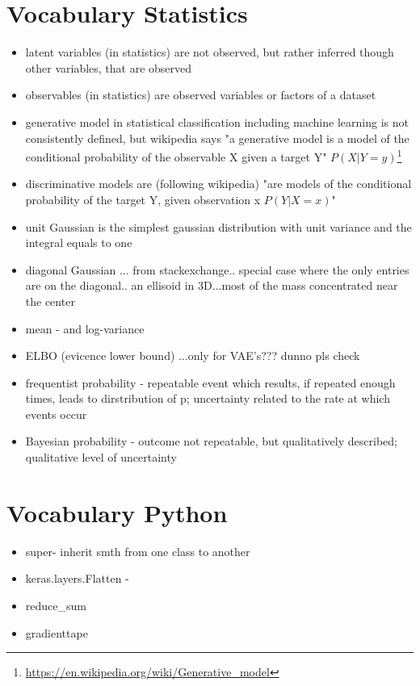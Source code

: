 \documentclass[12pt, a4paper]{article}
\begin{document}
	\section{Vocabulary Statistics}
	\begin{itemize}
		\item latent variables (in statistics) are not observed, but rather inferred though other variables, that are observed
		\item observables (in statistics) are observed variables or factors of a dataset
		 \item generative model  in statistical classification including machine learning is not consistently defined, but wikipedia says "a generative model is a model of the conditional probability of the observable X given a target Y" $P(X|Y=y)$\footnote{\url{https://en.wikipedia.org/wiki/Generative_model}}
		 \item discriminative models are (following wikipedia) "are models of the conditional probability of the target Y, given observation x $P(Y|X=x)$"
		 \item unit Gaussian is the simplest gaussian distribution with unit variance and the integral equals to one
		 \item diagonal Gaussian ... from stackexchange.. special case where the only entries are on the diagonal.. an ellisoid in 3D...most of the mass concentrated near the center
		 \item mean - and log-variance
		 \item ELBO (evicence lower bound) ...only for VAE's??? dunno pls check
		 \item frequentist probability - repeatable event which results, if repeated enough times, leads to dirstribution of p; uncertainty related to the rate at which events occur
		 \item Bayesian probability - outcome not repeatable, but qualitatively described; qualitative level of uncertainty
	\end{itemize}
	\section{Vocabulary Python}
		\begin{itemize}
			\item super- inherit smth from one class to another
			\item keras.layers.Flatten - 
			\item reduce\_sum
			\item gradienttape
		\end{itemize}
\end{document}
